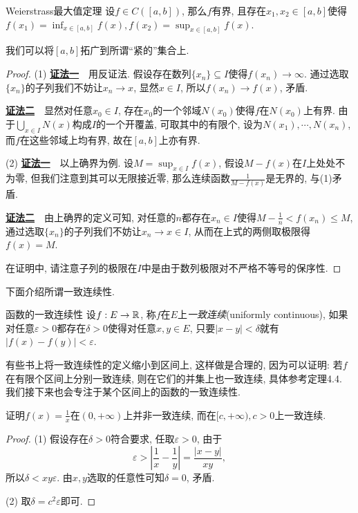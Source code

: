 \begin{theorem}{Weierstrass最大值定理}
	设$f \in C([a,b])$, 那么$f$有界, 且存在$x_1,x_2 \in [a,b]$使得$f(x_1) = \inf_{x \in [a,b]} f(x), f(x_2) = \sup_{x \in [a,b]}f(x)$. 
\end{theorem}
\begin{remark}
	我们可以将$[a,b]$拓广到所谓“紧的”集合上. 
\end{remark}
\begin{proof}
	(1) \underline{\textbf{证法一}}~~用反证法. 假设存在数列$\{ x_n \} \subseteq I$使得$f(x_n) \to \infty$. 通过选取$\{ x_n \}$的子列我们不妨让$x_n \to x$, 显然$x \in I$, 所以$f(x_n) \to f(x)$, 矛盾. 
	
	\underline{\textbf{证法二}}~~显然对任意$x_0 \in I$, 存在$x_0$的一个邻域$N(x_0)$使得$f$在$N(x_0)$上有界. 由于$\bigcup_{x \in I} N(x)$构成$I$的一个开覆盖, 可取其中的有限个, 设为$N(x_1), \cdots ,N(x_n)$, 而$f$在这些邻域上均有界, 故在$[a,b]$上亦有界. 
	
	(2) \underline{\textbf{证法一}}~~以上确界为例. 设$M=\sup_{x \in I}f(x)$, 假设$M-f(x)$在$I$上处处不为零, 但我们注意到其可以无限接近零, 那么连续函数$\frac{1}{M-f(x)}$是无界的, 与(1)矛盾. 
	
	\underline{\textbf{证法二}}~~由上确界的定义可知, 对任意的$n$都存在$x_n \in I$使得$M-\frac{1}{n} < f(x_n) \leq M$, 通过选取$\{x_n\}$的子列我们不妨让$x_n \to x \in I$, 从而在上式的两侧取极限得$f(x)=M$. 
	
	在证明中, 请注意子列的极限在$I$中是由于数列极限对不严格不等号的保序性. 
\end{proof}

下面介绍所谓一致连续性. 

\begin{definition}{函数的一致连续性}
	设$f:E \to \mathbb{R}$, 称$f$在$E$上\textit{一致连续}(uniformly continuous), 如果对任意$\varepsilon >0$都存在$\delta >0$使得对任意$x,y \in E$, 只要$|x-y|<\delta$就有$|f(x)-f(y)|<\varepsilon$. 
\end{definition}
\begin{remark}
	有些书上将一致连续性的定义缩小到区间上, 这样做是合理的, 因为可以证明: 若$f$在有限个区间上分别一致连续, 则在它们的并集上也一致连续, 具体参考定理4.4. 我们接下来也会专注于某个区间上的函数的一致连续性. 
\end{remark}

\begin{example}
	证明$f(x)=\frac{1}{x}$在$(0,+\infty)$上并非一致连续, 而在$[c ,+\infty ), c >0$上一致连续. 
\end{example}
\begin{proof}
	(1) 假设存在$\delta >0$符合要求, 任取$\varepsilon >0$, 由于$$\varepsilon > |\frac{1}{x}-\frac{1}{y}| = \frac{|x-y|}{xy},$$
	所以$\delta <xy\varepsilon$. 由$x,y$选取的任意性可知$\delta =0$, 矛盾. 
	
	(2) 取$\delta = c^2\varepsilon$即可. 
\end{proof}


